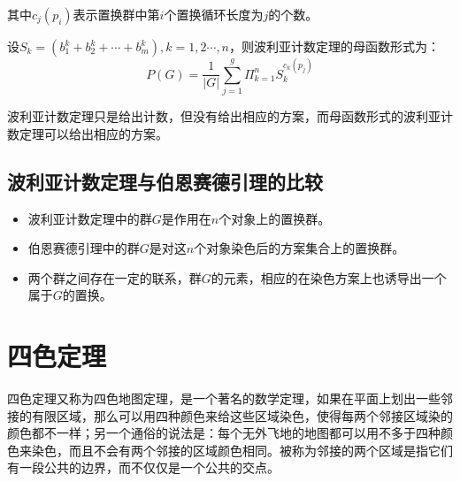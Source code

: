 \documentclass[12pt]{article} %
\begin{document}
其中${\displaystyle c_{j}(p_{i})}$表示置换群中第$i$个置换循环长度为$j$的个数。

设${\displaystyle S_{k}=(b_{1}^{k}+b_{2}^{k}+\cdots +b_{m}^{k}),k=1,2\cdots ,n}$，则波利亚计数定理的母函数形式为：
\begin{equation}
\label{eqn:eqn1}
P(G)=\frac{1}{|G|} \sum_{j=1}^{g} \Pi_{k=1}^{n} S_{k}^{c_{k}\left(p_{j}\right)}
\end{equation}

波利亚计数定理只是给出计数，但没有给出相应的方案，而母函数形式的波利亚计数定理可以给出相应的方案。








\subsection{波利亚计数定理与伯恩赛德引理的比较}














\begin{itemize}
    \item 波利亚计数定理中的群$G$是作用在$n$个对象上的置换群。
    \item
    伯恩赛德引理中的群$G$是对这$n$个对象染色后的方案集合上的置换群。
    \item
    两个群之间存在一定的联系，群$G$的元素，相应的在染色方案上也诱导出一个属于$G$的置换。
\end{itemize}




















\section{四色定理}
四色定理又称为四色地图定理，是一个著名的数学定理，如果在平面上划出一些邻接的有限区域，那么可以用四种颜色来给这些区域染色，使得每两个邻接区域染的颜色都不一样\cite{newyork}\cite{alex}；另一个通俗的说法是：每个无外飞地的地图都可以用不多于四种颜色来染色，而且不会有两个邻接的区域颜色相同。被称为邻接的两个区域是指它们有一段公共的边界，而不仅仅是一个公共的交点。
\end{document}
